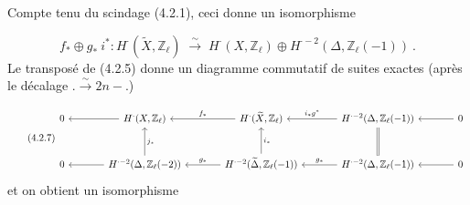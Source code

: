 
Compte tenu du scindage (4.2.1), ceci donne un isomorphisme

\begin{equation}\tag{4.2.6}
f_* \oplus g_* \ i^* : H^{\cdot}(\widetilde{X},\mathbb{Z}_\ell) \;\stackrel{\sim}{\longrightarrow}\; H^{\cdot}(X,\mathbb{Z}_\ell) \oplus H^{\cdot-2}(\Delta,\mathbb{Z}_\ell(-1)) \ .
\end{equation}
Le transposé de (4.2.5) donne un diagramme commutatif de suites exactes (après le décalage $. \stackrel{\sim}{\longrightarrow} 2n-.$)

\begin{equation}\tag{4.2.7}
\begin{tikzcd}[column sep=large, row sep=large]
0 & H^{\cdot}(X,\mathbb{Z}_\ell) \arrow[l] & H^{\cdot}(\widetilde{X},\mathbb{Z}_\ell) \arrow[l, "f_*"'] & H^{\cdot-2}(\Delta,\mathbb{Z}_\ell(-1)) \arrow[l, "i_*g^*"'] & 0 \arrow[l] \\
0 & H^{\cdot-2}(\Delta,\mathbb{Z}_\ell(-2)) \arrow[l] \arrow[u, "j_*"'] & H^{\cdot-2}(\widetilde{\Delta},\mathbb{Z}_\ell(-1)) \arrow[l, "g_*"'] \arrow[u, "i_*"'] & H^{\cdot-2}(\Delta,\mathbb{Z}_\ell(-1)) \arrow[l, "g_*"'] \arrow[u, equal] & 0 \arrow[l]
\end{tikzcd}
\end{equation}
et on obtient un isomorphisme

